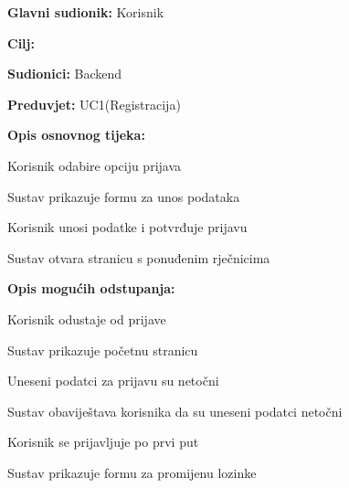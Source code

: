				\noindent {}
				\begin{packed_item}
					
					\item \textbf{Glavni sudionik: } Korisnik
					\item  \textbf{Cilj:} 
					\item  \textbf{Sudionici:} Backend
					\item  \textbf{Preduvjet:} UC1(Registracija)
					\item  \textbf{Opis osnovnog tijeka:}
					
					\item[] \begin{packed_enum}
						
							\item Korisnik odabire opciju prijava
							\item Sustav prikazuje formu za unos podataka
							\item Korisnik unosi podatke i potvrđuje prijavu
							\item Sustav otvara stranicu s ponuđenim rječnicima 
					\end{packed_enum}
					
					\item  \textbf{Opis mogućih odstupanja:}
					
					\item[] \begin{packed_item}
						
						\item[3.a] Korisnik odustaje od prijave
						\item[] \begin{packed_enum}
							
							\item Sustav prikazuje početnu stranicu
							
						\end{packed_enum}
						
						\item[3.b] Uneseni podatci za prijavu su netočni
							\item[] \begin{packed_enum}
								
								\item Sustav obaviještava korisnika da su uneseni podatci netočni
								
							\end{packed_enum}
						
						\item[3.c] Korisnik se prijavljuje po prvi put
						\item[] \begin{packed_enum}
							
							\item Sustav prikazuje formu za promijenu lozinke
							
						\end{packed_enum}
							
						
					\end{packed_item}
				\end{packed_item}
				
